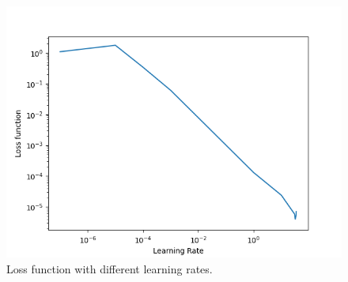 \documentclass{article}
\begin{document}
\begin{figure}
  \centering
  \includegraphics[width=0.6\linewidth]{learning_rates.png}
  \caption{Loss function with different learning rates.}
  \label{fig:learning_rates}
\end{figure}
\end{document}
